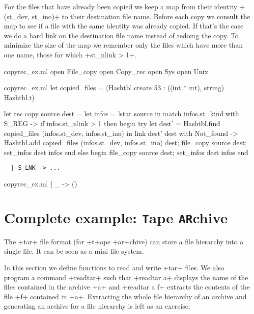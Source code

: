 \begin{answer}
For the files that have already been copied we keep a map from their
identity \ml+(st_dev, st_ino)+ to their destination file name. Before
each copy we consult the map to see if a file with the same identity
was already copied. If that's the case we do a hard link on the
destination file name instead of redoing the copy. To minimize the
size of the map we remember only the files which have more than one
name, \ie{} those for which \ml+st_nlink > 1+.
%
\begin{codefile}{copyrec_ex.ml}
open File_copy
open Copy_rec
open Sys
open Unix
\end{codefile}
%
\begin{listingcodefile}{copyrec_ex.ml}
let copied_files = (Hashtbl.create 53 : ((int * int), string) Hashtbl.t)

let rec copy source dest =
  let infos = lstat source in
  match infos.st_kind with
    S_REG ->
      if infos.st_nlink > 1 then begin
        try
          let dest' = 
            Hashtbl.find copied_files (infos.st_dev, infos.st_ino)
          in link dest' dest
        with Not_found ->
          Hashtbl.add copied_files (infos.st_dev, infos.st_ino) dest;
          file_copy source dest;
          set_infos dest infos
      end else begin
        file_copy source dest;
        set_infos dest infos
      end
\end{listingcodefile}
\begin{lstlisting}
  | S_LNK -> ...
\end{lstlisting}
\begin{codefile}{copyrec_ex.ml}
| _ -> ()
\end{codefile}
\end{answer}

\section{Complete example: {\normalfont\texttt{T}}ape {\normalfont\texttt{AR}}chive}

The \ml+tar+ file format (for \ml+t+ape \ml+ar+chive) can store a file
hierarchy into a single file. It can be seen as a mini file system.

In this section we define functions to read and write \ml+tar+
files. We also program a command \ml+readtar+ such that \ml+readtar a+
displays the name of the files contained in the archive \ml+a+ and
\ml+readtar a f+ extracts the contents of the file \ml+f+ contained in
\ml+a+. Extracting the whole file hierarchy of an archive and
generating an archive for a file hierarchy is left as an exercise.

